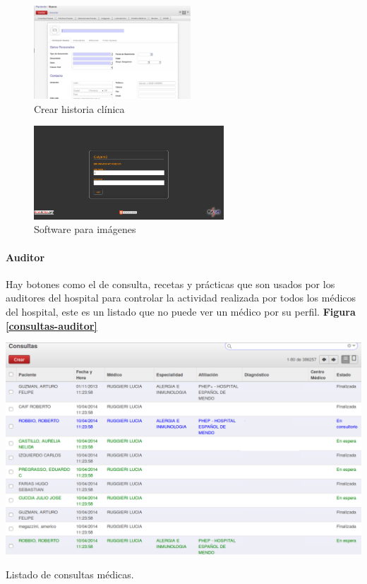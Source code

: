 \begin{correccionFigure}[h]
      \centering
      \begin{subfigure}[t]{0.48\textwidth}
        \includegraphics[height=3.5cm]{img/tp1/HE/HCUD2}
        \caption{Crear historia clínica}
        \label{hc-nueva}
      \end{subfigure}
      \hfill%
      \begin{subfigure}[t]{0.548\textwidth}
        \includegraphics[height=3.5cm]{img/tp1/HE/Imagenes}
        \caption{Software para imágenes}
        \label{sw-imagen}
	  \end{subfigure}
\end{correccionFigure}


\paragraph{Auditor}

Hay botones como el de consulta, recetas y prácticas que son usados por los auditores del hospital para controlar la actividad realizada por todos los médicos del hospital, este es un listado que no puede ver un médico por su perfil. \textbf{Figura \ref{consultas-auditor}}


\begin{correccionFigure}[h]
      \centering
      \includegraphics[width=.8\textwidth]{img/tp1/HE/HCUDConsulta}
      \caption{Listado de consultas médicas.}
      \label{consultas-auditor}
\end{correccionFigure}


